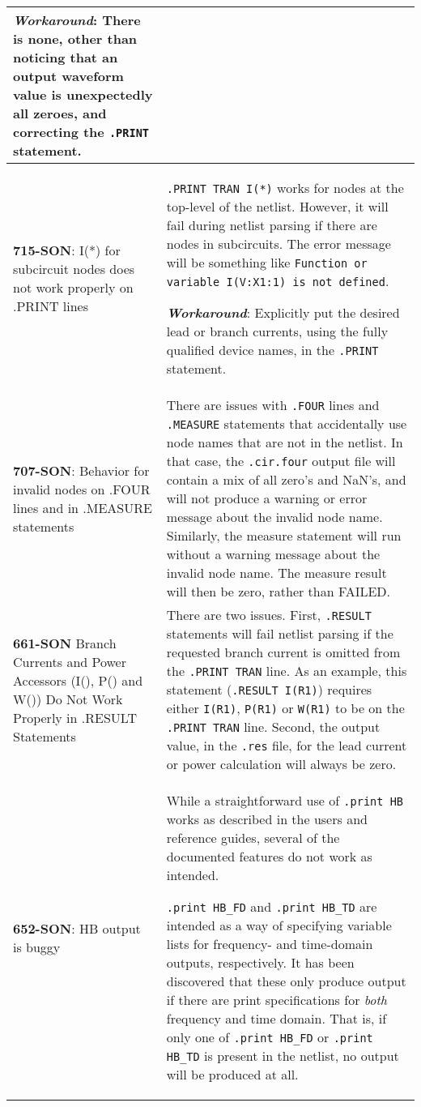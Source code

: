 {\begin{longtable}[h] {>{\raggedright\small}m{2in}|>{\raggedright\let\\\tabularnewline\small}m{3.5in}}
\textbf{\textit{Workaround}}: There is none, other than noticing that an output waveform value is 
unexpectedly all zeroes, and correcting the \texttt{.PRINT} statement. \\ \hline

\textbf{715-SON}: I(*) for subcircuit nodes does not work properly on .PRINT lines & 
\texttt{.PRINT TRAN I(*)} works for nodes at the top-level of the netlist.  However, it will
fail during netlist parsing if there are nodes in subcircuits.  The error message will be 
something like \texttt{Function or variable I(V:X1:1) is not defined}.

\textbf{\textit{Workaround}}: Explicitly put the desired lead or branch currents, using the
fully qualified device names, in the \texttt{.PRINT} statement. \\ \hline

\textbf{707-SON}: Behavior for invalid nodes on .FOUR lines and in .MEASURE statements &
There are issues with \texttt{.FOUR} lines and \texttt{.MEASURE} statements that accidentally
use node names that are not in the netlist.  In that case, the \texttt{.cir.four} output file 
will contain a mix of all zero's and NaN's, and \Xyce{} will not produce a warning or error 
message about the invalid node name.  Similarly, the measure statement will run without a 
warning message about the invalid node name.  The measure result will then be zero, rather than 
FAILED. \\ \hline

\textbf{661-SON} Branch Currents and Power Accessors (I(), P() and W()) Do Not Work 
Properly in .RESULT Statements  & There are two issues.  First, \texttt{.RESULT} statements 
will fail netlist parsing if the requested branch current is omitted from the \texttt{.PRINT TRAN} 
line.  As an example, this statement (\texttt{.RESULT I(R1)}) requires either \texttt{I(R1)},
\texttt{P(R1)} or \texttt{W(R1)} to be on the \texttt{.PRINT TRAN} line.  Second, the
output value, in the \texttt{.res} file, for the lead current or power calculation will 
always be zero.
\\ \hline 

\textbf{652-SON}: HB output is buggy & While a straightforward use of \texttt{.print HB} works as described in the users and reference guides, several of the documented features do not work as intended.

\texttt{.print HB\_FD} and \texttt{.print HB\_TD} are intended as a way of specifying variable lists for frequency- and time-domain outputs, respectively.  It has been discovered that these only produce output if there are print specifications for {\em both\/} frequency and time domain.  That is, if only one of \texttt{.print HB\_FD} or \texttt{.print HB\_TD} is present in the netlist, no output will be produced at all.   


\end{longtable}}
